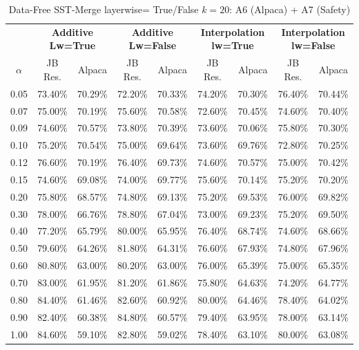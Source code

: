\begin{table}[h]
\centering
\caption{Data-Free SST-Merge layerwise= True/False $k=20$: A6 (Alpaca) + A7 (Safety)}
\label{tab:res_a6_a7_data_free_sst_20}
\begin{tabular}{c|cc|cc|cc|cc}
\hline
 & \multicolumn{2}{c|}{\textbf{Additive Lw=True}} & \multicolumn{2}{c|}{\textbf{Additive Lw=False}} & \multicolumn{2}{c|}{\textbf{Interpolation lw=True}}& \multicolumn{2}{c}{\textbf{Interpolation lw=False}} \\
$\alpha$ & JB Res. & Alpaca & JB Res. & Alpaca & JB Res. & Alpaca & JB Res. & Alpaca \\
\hline
0.05 & 73.40\% & 70.29\% & 72.20\% & 70.33\% & 74.20\% & 70.30\% & 76.40\% & 70.44\% \\
0.07 & 75.00\% & 70.19\% & 75.60\% & 70.58\% & 72.60\% & 70.45\% & 74.60\% & 70.40\% \\
0.09 & 74.60\% & 70.57\% & 73.80\% & 70.39\% & 73.60\% & 70.06\% & 75.80\% & 70.30\% \\
0.10 & 75.20\% & 70.54\% & 75.00\% & 69.64\% & 73.60\% & 69.76\% & 72.80\% & 70.25\% \\
0.12 & 76.60\% & 70.19\% & 76.40\% & 69.73\% & 74.60\% & 70.57\% & 75.00\% & 70.42\% \\
0.15 & 74.60\% & 69.08\% & 74.00\% & 69.77\% & 75.60\% & 70.14\% & 75.20\% & 70.20\% \\
0.20 & 75.80\% & 68.57\% & 74.80\% & 69.13\% & 75.20\% & 69.53\% & 76.00\% & 69.82\% \\
0.30 & 78.00\% & 66.76\% & 78.80\% & 67.04\% & 73.00\% & 69.23\% & 75.20\% & 69.50\% \\
0.40 & 77.20\% & 65.79\% & 80.00\% & 65.95\% & 76.40\% & 68.74\% & 74.60\% & 68.66\% \\
0.50 & 79.60\% & 64.26\% & 81.80\% & 64.31\% & 76.60\% & 67.93\% & 74.80\% & 67.96\% \\
0.60 & 80.80\% & 63.00\% & 80.20\% & 63.00\% & 76.00\% & 65.39\% & 75.00\% & 65.35\% \\
0.70 & 83.00\% & 61.95\% & 81.20\% & 61.86\% & 75.80\% & 64.63\% & 74.20\% & 64.77\% \\
0.80 & 84.40\% & 61.46\% & 82.60\% & 60.92\% & 80.00\% & 64.46\% & 78.40\% & 64.02\% \\
0.90 & 82.40\% & 60.38\% & 84.80\% & 60.57\% & 79.40\% & 63.95\% & 78.00\% & 63.14\% \\
1.00 & 84.60\% & 59.10\% & 82.80\% & 59.02\% & 78.40\% & 63.10\% & 80.00\% & 63.08\% \\
\hline
\end{tabular}
\end{table}
\FloatBarrier

